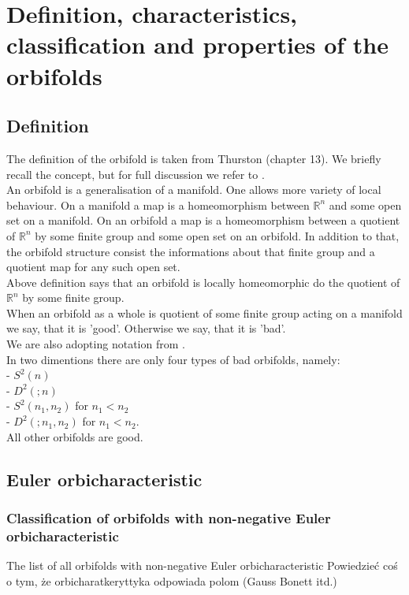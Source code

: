 \chapter{Definition, characteristics, classification and properties of the orbifolds}
\section{Definition}
The definition of the orbifold is taken from Thurston \cite{Thurston1979} (chapter 13). 
We briefly recall the concept, but for full discussion we refer to \cite{Thurston1979}. \\
An orbifold is a generalisation of a manifold. One allows more variety of local behaviour. 
On a manifold a map is a homeomorphism between $\mathbb{R}^n$ and some open set on a manifold. 
On an orbifold a map is a homeomorphism between a quotient of $\mathbb{R}^n$ by some 
finite group and some open set on an orbifold. 
In addition to that, the orbifold structure consist the informations about that finite group 
and a quotient map for any such open set. \\

Above definition says that an orbifold is locally homeomorphic do the quotient of $\mathbb{R}^n$ 
by some finite group. \\
When an orbifold as a whole is quotient of some finite group acting on a manifold we say, that 
it is 'good'. Otherwise we say, that it is 'bad'. \\

We are also adopting notation from \cite{Thurston1979}. \\

In two dimentions there are only four types of bad orbifolds, namely: \\
- $S^2(n)$ \\
- $D^2(;n)$ \\
- $S^2(n_1,n_2)$ for $n_1 < n_2$ \\
- $D^2(;n_1,n_2)$ for $n_1 < n_2$. \\
All other orbifolds are good.
\section{Euler orbicharacteristic}
\subsection{Classification of orbifolds with non-negative Euler orbicharacteristic}
The list of all orbifolds with non-negative Euler orbicharacteristic
Powiedzieć coś o tym, że orbicharatkeryttyka odpowiada polom (Gauss Bonett itd.)
